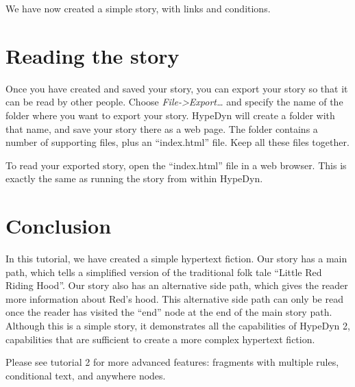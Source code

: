 \documentclass{article}
\begin{document}
We have now created a simple story, with links and conditions.

\section{Reading the story}

Once you have created and saved your story, you can export your story so that it can be read by other people. Choose \textit{File->Export\ldots} and specify the name of the folder where you want to export your story. HypeDyn will create a folder with that name, and save your story there as a web page. The folder contains a number of supporting files, plus an ``index.html'' file. Keep all these files together.

To read your exported story, open the ``index.html'' file in a web browser. This is exactly the same as running the story from within HypeDyn.

\section{Conclusion}

In this tutorial, we have created a simple hypertext fiction. Our story has a main path, which tells a simplified version of the traditional folk tale ``Little Red Riding Hood''. Our story also has an alternative side path, which gives the reader more information about Red's hood. This alternative side path can only be read once the reader has visited the ``end'' node at the end of the main story path. Although this is a simple story, it demonstrates all the capabilities of HypeDyn 2, capabilities that are sufficient to create a more complex hypertext fiction.

Please see tutorial 2 for more advanced features: fragments with multiple rules, conditional text, and anywhere nodes.
\end{document}
